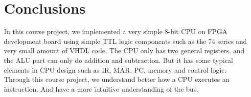 \section{Conclusions}
\label{sec:conclusions}
In this course project, we implemented a very simple 8-bit CPU on FPGA development board using simple TTL logic components such as the 74 series and very small amount of VHDL code. The CPU only has two general registers, and the ALU part can only do addition and subtraction. But it has some typical elements in CPU design such as IR, MAR, PC, memory and control logic. Through this course project, we understand better how a CPU executes an instruction. And have a more intuitive understanding of the bus.


